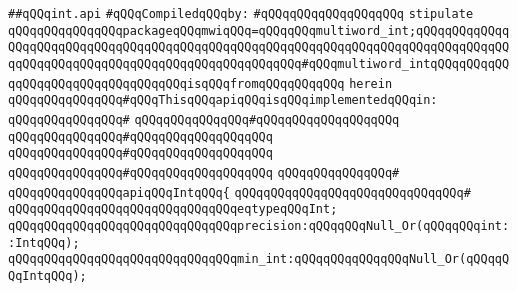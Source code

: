 \label{src/lib/std/src/int.api}
\verb|##qQQqint.api|\newline
\newline
\verb|#qQQqCompiledqQQqby:|\newline
\verb|#qQQqqQQqqQQqqQQqqQQq|\newline
\newline
\newline
\verb|stipulate|\newline
\verb|qQQqqQQqqQQqqQQqpackageqQQqmwiqQQq=qQQqqQQqmultiword_int;qQQqqQQqqQQqqQQqqQQqqQQqqQQqqQQqqQQqqQQqqQQqqQQqqQQqqQQqqQQqqQQqqQQqqQQqqQQqqQQqqQQqqQQqqQQqqQQqqQQqqQQqqQQqqQQqqQQqqQQqqQQq#qQQqmultiword_intqQQqqQQqqQQqqQQqqQQqqQQqqQQqqQQqqQQqisqQQqfromqQQqqQQqqQQq|\newline
\verb|herein|\newline
\newline
\verb|qQQqqQQqqQQqqQQq#qQQqThisqQQqapiqQQqisqQQqimplementedqQQqin:|\newline
\verb|qQQqqQQqqQQqqQQq#|\newline
\verb|qQQqqQQqqQQqqQQq#qQQqqQQqqQQqqQQqqQQq|\newline
\verb|qQQqqQQqqQQqqQQq#qQQqqQQqqQQqqQQqqQQq|\newline
\verb|qQQqqQQqqQQqqQQq#qQQqqQQqqQQqqQQqqQQq|\newline
\verb|qQQqqQQqqQQqqQQq#qQQqqQQqqQQqqQQqqQQq|\newline
\verb|qQQqqQQqqQQqqQQq#|\newline
\verb|qQQqqQQqqQQqqQQqapiqQQqIntqQQq{|\newline
\verb|qQQqqQQqqQQqqQQqqQQqqQQqqQQqqQQq#|\newline
\verb|qQQqqQQqqQQqqQQqqQQqqQQqqQQqqQQqeqtypeqQQqInt;|\newline
\newline
\verb|qQQqqQQqqQQqqQQqqQQqqQQqqQQqqQQqprecision:qQQqqQQqNull_Or(qQQqqQQqint::IntqQQq);|\newline
\verb|qQQqqQQqqQQqqQQqqQQqqQQqqQQqqQQqmin_int:qQQqqQQqqQQqqQQqNull_Or(qQQqqQQqIntqQQq);|\newline

